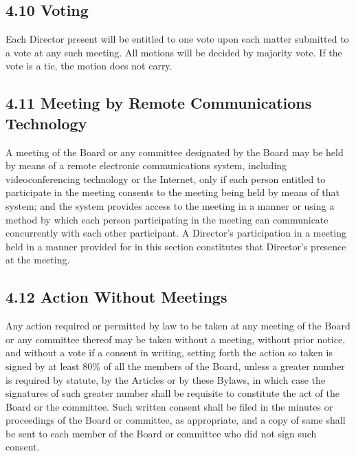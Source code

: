 \documentclass[
]{book}
\begin{document}
\subsection{4.10 Voting}\label{voting}

Each Director present will be entitled to one vote upon each matter submitted to a vote at any such meeting. All motions will be decided by majority vote. If the vote is a tie, the motion does not carry.

\subsection{4.11 Meeting by Remote Communications Technology}\label{meeting-by-remote-communications-technology}

A meeting of the Board or any committee designated by the Board may be held by means of a remote electronic communications system, including videoconferencing technology or the Internet, only if each person entitled to participate in the meeting consents to the meeting being held by means of that system; and the system provides access to the meeting in a manner or using a method by which each person participating in the meeting can communicate concurrently with each other participant. A Director's participation in a meeting held in a manner provided for in this section constitutes that Director's presence at the meeting.

\subsection{4.12 Action Without Meetings}\label{action-without-meetings}

Any action required or permitted by law to be taken at any meeting of the Board or any committee thereof may be taken without a meeting, without prior notice, and without a vote if a consent in writing, setting forth the action so taken is signed by at least 80\% of all the members of the Board, unless a greater number is required by statute, by the Articles or by these Bylaws, in which case the signatures of such greater number shall be requisite to constitute the act of the Board or the committee. Such written consent shall be filed in the minutes or proceedings of the Board or committee, as appropriate, and a copy of same shall be sent to each member of the Board or committee who did not sign such consent.
\end{document}
